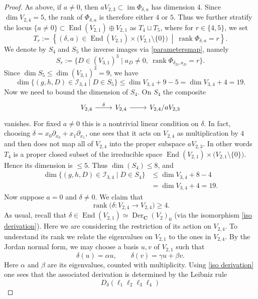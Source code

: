 \documentclass[a4paper,12pt,twoside,reqno]{amsart}
\numberwithin{equation}{section}
\theoremstyle{plain}
\theoremstyle{definition}
\DeclareMathOperator{\rank}{rank}
\newcommand{\CC}{\mathbf{C}}
\theoremstyle{plain}
\theoremstyle{definition}
\begin{document}
\begin{proof}
As above, if $a\ne0$, then $aV_{2,3}\subset\operatorname{im}\Phi_{\delta,a}$ has dimension $4$. Since $\dim V_{2,4}=5$, the rank of $\Phi_{\delta,a}$ is therefore either $4$ or $5$. Thus we further stratify the locus $\{a \neq 0\}\subset \operatorname{End}(V_{2,1}) \oplus V_{2,1} $ as $T_4 \sqcup T_5$,
where for $r\in\{4,5\}$,  we set
\[
T_r:=
\left\{
(\delta,a)\in
\operatorname{End}(V_{2,1})\times
\bigl(V_{2,1}\setminus\{0\}\bigr)
\ \middle|\
\rank\Phi_{\delta,a}=r
\right\}.
\]
We denote by $S_4$ and $S_5$ the inverse images via \eqref{parametersmap}, namely
\[
   S_r:=\{D\in(V_{3,1})^3\mid a_D\ne0,\
   \rank\Phi_{\delta_D,a_D}=r\}.
\]
Since $\dim S_5\leq \operatorname{dim}(V_{3,1})^3=9$, we have
\[
   \dim\{(g,h,D) \in \mathcal{I}_{3,4}\mid D\in S_5\}
   \le\dim V_{3,4}+9-5=\dim V_{3,4}+4=19.
\]
Now we need to bound the dimension of $S_4$. On $S_4$ the composite
\[
\begin{tikzcd}
V_{2,4} \arrow[r, "\delta"] & V_{2,4} \arrow[r] & V_{2,4}/aV_{2,3}
\end{tikzcd}
\]
vanishes. For fixed $a\ne0$ this is a nontrivial linear condition on $\delta$. In fact, choosing $\delta=x_0\partial_{x_0}+x_1\partial_{x_1}$,  one sees that it acts on $V_{2,4}$ as multiplication by $4$ and then does not
map all of $V_{2,4}$ into the proper subspace $aV_{2,3}$. In other words $T_4$ is a proper closed subset of the irreducible space $\operatorname{End}(V_{2,1})\times
\bigl(V_{2,1}\setminus\{0\})$. Hence its dimension is $\leq 5$. Thus $\operatorname{dim}(S_4) \leq 8$, and 
\begin{align*}
   \dim\{(g,h,D) \in \mathcal{I}_{3,4} \mid D\in S_4\}
   &\le\dim V_{3,4}+8-4\\
   &=\dim V_{3,4}+4=19.
\end{align*}
Now suppose \(a=0\) and \(\delta\neq0\). We claim that
\[
\rank\bigl(\delta\colon V_{2,4}\longrightarrow V_{2,4}\bigr)\ge4.
\]
As usual, recall that  $\delta  \in \operatorname{End}(V_{2,1}) \simeq \operatorname{Der}_{\CC}(V_2)_0$ (via the isomorphism \eqref{iso derivation}). Here we are considering the restriction of its action on $V_{2,4}$. To understand its  rank we relate the eigenvalues on  $V_{2,1}$ to the ones in $V_{2,4}$.  By the Jordan normal form, we may choose a basis \(u,v\) of
\(V_{2,1}\) such that
\[
\delta(u)=\alpha u,
\qquad
\delta(v)=\gamma u+\beta v.
\]
Here  \(\alpha\) and \(\beta\) are its eigenvalues, counted with
multiplicity. Using \eqref{iso derivation} one sees that  the associated derivation is determined by the Leibniz
rule
\[
D_\delta(\ell_1\ell_2\ell_3\ell_4)
\]
\end{proof}
\end{document}

